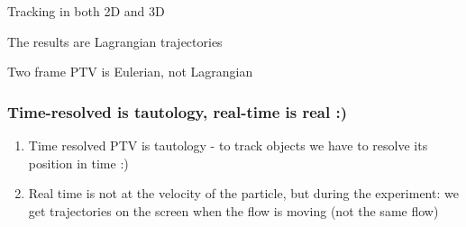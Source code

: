 \begin{frame}[label=ptv-61]{Tracking in both 2D and 3D}
	\centering{}
\end{frame}

			

\begin{frame}[label=ptv-7]{The results are Lagrangian trajectories}
\centering
{}
\end{frame}

\begin{frame}[label=ptv-71]{Two frame PTV is Eulerian, not Lagrangian}
\centering{}
\end{frame}

\begin{frame}[label=ptv-8]
\frametitle{Time-resolved is tautology, real-time is real :) }
\begin{enumerate}
\item Time resolved PTV is tautology - to track objects we have to resolve its position in time :) 
\item Real time is not at the velocity of the particle, but during the experiment: we get trajectories on the screen when the flow is moving (not the same flow)
\end{enumerate}
\end{frame}

